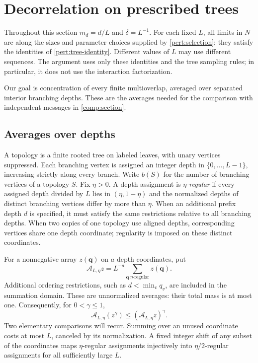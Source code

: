 \section{Decorrelation on prescribed trees}
\label{decor:section}

Throughout this section $m_d=d/L$ and $\delta=L^{-1}$.  For each fixed
$L$, all limits in $N$ are along the sizes and parameter choices supplied
by \cref{pert:selection}; they satisfy the identities of
\cref{pert:tree-identity}. Different values of $L$ may use different
sequences. The argument uses only these identities and the tree sampling
rules; in particular, it does not use the interaction factorization.

Our goal is concentration of every finite multioverlap, averaged over
separated interior branching depths. These are the averages needed for
the comparison with independent messages in \cref{comp:section}.

\subsection{Averages over depths}
\label{decor:averages}

A topology is a finite rooted tree on labeled leaves, with unary vertices
suppressed.  Each branching vertex is assigned an integer depth in
$\{0,\ldots,L-1\}$, increasing strictly along every branch.  Write $b(S)$
for the number of branching vertices of a topology $S$.  Fix $\eta>0$.
A depth assignment is \emph{$\eta$-regular} if every assigned depth divided
by $L$ lies in $(\eta,1-\eta)$ and the normalized depths of distinct
branching vertices differ by more than $\eta$.  When an additional
prefix depth $d$ is specified, it must satisfy the same restrictions
relative to all branching depths.  When two copies of one topology use
aligned depths, corresponding vertices share one depth coordinate;
regularity is imposed on these distinct coordinates.

For a nonnegative array $z(\mathbf q)$ on $a$ depth coordinates, put
\begin{equation}
 \mathcal A_{L,\eta}z
   =L^{-a}\sum_{\mathbf q\;\eta\text{-regular}}z(\mathbf q).
 \label{decor:average-definition}
\end{equation}
Additional ordering restrictions, such as $d<\min_v q_v$, are included
in the summation domain.  These are unnormalized averages: their total
mass is at most one.  Consequently, for $0<\gamma\le1$,
\begin{equation}
 \mathcal A_{L,\eta}(z^\gamma)
       \le (\mathcal A_{L,\eta}z)^\gamma.
 \label{decor:average-holder}
\end{equation}
Two elementary comparisons will recur. Summing over an unused coordinate
costs at most $L$, canceled by its normalization. A fixed integer shift of
any subset of the coordinates maps $\eta$-regular assignments injectively
into $\eta/2$-regular assignments for all sufficiently large $L$.


